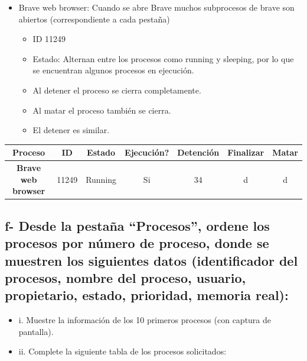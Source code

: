 \documentclass{article}
\begin{document}
\begin{itemize}
  \item Brave web browser: Cuando se abre Brave muchos subprocesos de brave son abiertos (correspondiente a cada pestaña)
  \begin{itemize}
    \item ID 11249
    \item Estado: Alternan entre los procesos como running y sleeping, por lo que se encuentran algunos procesos en ejecución.
    \item Al detener el proceso se cierra completamente.
    \item Al matar el proceso también se cierra.
    \item El detener es similar.
  \end{itemize}
\end{itemize}
\begin{center}
    \begin{tabular}{|c|c|c|c|c|c|c|}   
    \hline
      \textbf{Proceso} & \textbf{ID} & \textbf{Estado} & \textbf{Ejecución?} & \textbf{Detención} & \textbf{Finalizar} & \textbf{Matar} \\
    \hline
      \textbf{Brave web browser} & 11249 & Running & Si & 34 & d & d\\
    \hline
  \end{tabular}
 \end{center}


\subsection*{f- Desde la pestaña “Procesos”, ordene los procesos por número de proceso, donde se muestren los
siguientes datos (identificador del procesos, nombre del proceso, usuario, propietario, estado,
prioridad, memoria real):}

\begin{itemize}
    \item i. Muestre la información de los 10 primeros procesos (con captura de pantalla).
    \item ii. Complete la siguiente tabla de los procesos solicitados:
\end{itemize}
\end{document}
